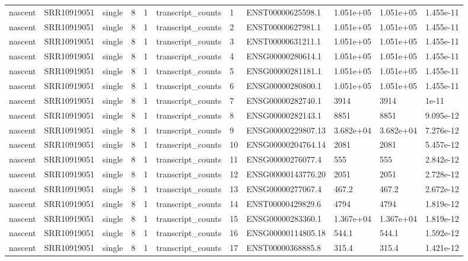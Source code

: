 \begin{tabular}{lllllllllll}
nascent & SRR10919051 & single & 8 & 1 & transcript\_counts & 1 & ENST00000625598.1 & 1.051e+05 & 1.051e+05 & 1.455e-11 \\
nascent & SRR10919051 & single & 8 & 1 & transcript\_counts & 2 & ENST00000627981.1 & 1.051e+05 & 1.051e+05 & 1.455e-11 \\
nascent & SRR10919051 & single & 8 & 1 & transcript\_counts & 3 & ENST00000631211.1 & 1.051e+05 & 1.051e+05 & 1.455e-11 \\
nascent & SRR10919051 & single & 8 & 1 & transcript\_counts & 4 & ENSG00000280614.1 & 1.051e+05 & 1.051e+05 & 1.455e-11 \\
nascent & SRR10919051 & single & 8 & 1 & transcript\_counts & 5 & ENSG00000281181.1 & 1.051e+05 & 1.051e+05 & 1.455e-11 \\
nascent & SRR10919051 & single & 8 & 1 & transcript\_counts & 6 & ENSG00000280800.1 & 1.051e+05 & 1.051e+05 & 1.455e-11 \\
nascent & SRR10919051 & single & 8 & 1 & transcript\_counts & 7 & ENSG00000282740.1 & 3914 & 3914 & 1e-11 \\
nascent & SRR10919051 & single & 8 & 1 & transcript\_counts & 8 & ENSG00000282143.1 & 8851 & 8851 & 9.095e-12 \\
nascent & SRR10919051 & single & 8 & 1 & transcript\_counts & 9 & ENSG00000229807.13 & 3.682e+04 & 3.682e+04 & 7.276e-12 \\
nascent & SRR10919051 & single & 8 & 1 & transcript\_counts & 10 & ENSG00000204764.14 & 2081 & 2081 & 5.457e-12 \\
nascent & SRR10919051 & single & 8 & 1 & transcript\_counts & 11 & ENSG00000276077.4 & 555 & 555 & 2.842e-12 \\
nascent & SRR10919051 & single & 8 & 1 & transcript\_counts & 12 & ENSG00000143776.20 & 2051 & 2051 & 2.728e-12 \\
nascent & SRR10919051 & single & 8 & 1 & transcript\_counts & 13 & ENSG00000277067.4 & 467.2 & 467.2 & 2.672e-12 \\
nascent & SRR10919051 & single & 8 & 1 & transcript\_counts & 14 & ENST00000429829.6 & 4794 & 4794 & 1.819e-12 \\
nascent & SRR10919051 & single & 8 & 1 & transcript\_counts & 15 & ENSG00000283360.1 & 1.367e+04 & 1.367e+04 & 1.819e-12 \\
nascent & SRR10919051 & single & 8 & 1 & transcript\_counts & 16 & ENSG00000114805.18 & 544.1 & 544.1 & 1.592e-12 \\
nascent & SRR10919051 & single & 8 & 1 & transcript\_counts & 17 & ENST00000368885.8 & 315.4 & 315.4 & 1.421e-12 \\

\end{tabular}

